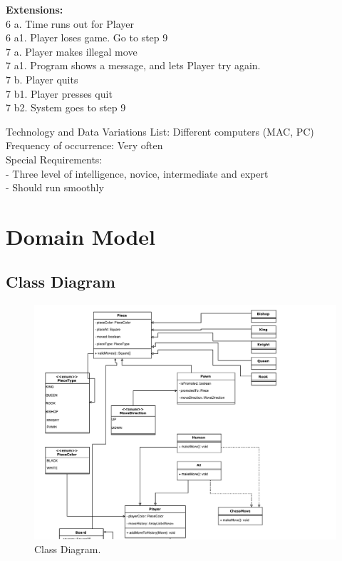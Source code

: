 \documentclass{article}
\begin{document}
\begin{flushleft}
\textbf{Extensions:}\\
6 a. Time runs out for Player\\
6 a1. Player loses game. Go to step 9\\
7 a. Player makes illegal move\\
7 a1. Program shows a message, and lets Player try again.\\
7 b. Player quits\\
7 b1. Player presses quit\\
7 b2. System goes to step 9\\
\vspace{3mm}

Technology and Data Variations List:\hspace{3mm} Different computers (MAC, PC)\\
Frequency of occurrence:\hspace{3mm} Very often\\
Special Requirements:\\
\hspace{5mm} - Three level of intelligence, novice, intermediate and expert\\
\hspace{5mm} - Should run smoothly\\
\vspace{10mm}

\newpage
\section{Domain Model}
\subsection{Class Diagram}

\begin{figure}[h]
	\includegraphics*[scale=0.7]{Class-diagram}
	\caption{Class Diagram.}	
\end{figure}
	
\end{flushleft}
\end{document}
